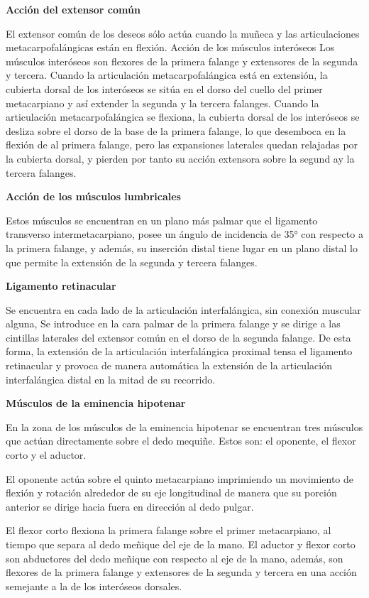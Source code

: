 \documentclass{article}
\begin{document}
\textbf{Acción del extensor común }

El extensor común de los deseos sólo actúa cuando la muñeca y las articulaciones metacarpofalángicas están en flexión.
Acción de los músculos interóseos 
Los músculos interóseos son flexores de la primera falange y extensores de la segunda y tercera. Cuando la articulación metacarpofalángica está en extensión, la cubierta dorsal de los interóseos se sitúa en el dorso del cuello del primer metacarpiano y así extender la segunda y la tercera falanges. 
Cuando la articulación metacarpofalángica se flexiona, la cubierta dorsal de los interóseos se desliza sobre el dorso de la base de la primera falange, lo que desemboca en  la flexión de al primera falange, pero las expansiones laterales quedan relajadas por la cubierta dorsal, y pierden por tanto su acción extensora sobre la segund ay la tercera falanges.

\textbf{Acción de los músculos lumbricales }

Estos músculos se encuentran en un plano más palmar que el ligamento transverso intermetacarpiano, posee un ángulo de incidencia de 35° con respecto a la primera falange, y además, su inserción distal tiene lugar en un plano distal lo que permite la extensión de la segunda y tercera falanges.

\textbf{Ligamento retinacular}

Se encuentra en cada lado de la articulación interfalángica, sin conexión muscular alguna, Se introduce en la cara palmar de la primera falange y se dirige a las cintillas laterales del extensor común en el dorso de la segunda falange. De esta forma, la extensión de la articulación interfalángica proximal tensa el ligamento retinacular y provoca de manera automática la extensión de la articulación interfalángica distal en la mitad de su recorrido.

\textbf{Músculos de la eminencia hipotenar} 

En la zona de los músculos de la eminencia hipotenar se encuentran tres músculos que actúan directamente sobre el dedo mequiñe. Estos son: el oponente, el flexor corto y el aductor.

El oponente actúa sobre el quinto metacarpiano imprimiendo un movimiento de flexión y rotación alrededor de su eje longitudinal de manera que su porción anterior se dirige hacia fuera en dirección al dedo pulgar.

El flexor corto flexiona la primera falange sobre el primer metacarpiano, al tiempo que separa al dedo meñique del eje de la mano.
\newpage
El aductor y flexor corto son abductores del dedo meñique con respecto al eje de la mano, además, son flexores de la primera falange y extensores de la segunda y tercera en una acción semejante a la de los interóseos dorsales.
\end{document}
